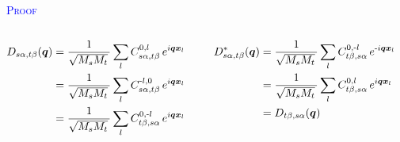 \begin{frame}
\begin{itemize}
    \textcolor{blue}{\textsc{Proof}}
      \small
      \begin{columns}[t]
        \begin{column}{0.5\textwidth}
          \begin{align*}
            D_{s\alpha,t\beta}(\boldsymbol{q})
            &=
            {1\over\sqrt{M_sM_t}\,}
            \sum_l
            C_{s\alpha,t\beta}^{0, l}\,
              e^{i\boldsymbol{q}\boldsymbol{x}_l} \cr
            &= 
            {1\over\sqrt{M_sM_t}\,}
            \sum_l
            C_{s\alpha,t\beta}^{\text{-}l, 0}\,
              e^{i\boldsymbol{q}\boldsymbol{x}_l} \cr
            &= 
            {1\over\sqrt{M_sM_t}\,}
            \sum_l
            C_{t\beta,s\alpha}^{0, \text{-}l}\,
              e^{i\boldsymbol{q}\boldsymbol{x}_l}
            \tikzmark{proof_1}
          \end{align*}
        \end{column}
        \begin{column}{0.4\textwidth}
          \begin{align*}
            \tikzmark{proof_2}
            D^*_{s\alpha,t\beta}(\boldsymbol{q})
            &=
            {1\over\sqrt{M_sM_t}\,}
            \sum_l
            C_{t\beta,s\alpha}^{0, \text{-}l}\,
              e^{\text{-}i\boldsymbol{q}\boldsymbol{x}_l} \cr
            &=
            {1\over\sqrt{M_sM_t}\,}
            \sum_l
            C_{t\beta,s\alpha}^{0, l}\,
              e^{i\boldsymbol{q}\boldsymbol{x}_l} \cr
            &= 
            D_{t\beta,s\alpha}(\boldsymbol{q})
          \end{align*}
        \end{column}
      \end{columns}

  \end{itemize}
\end{frame}

